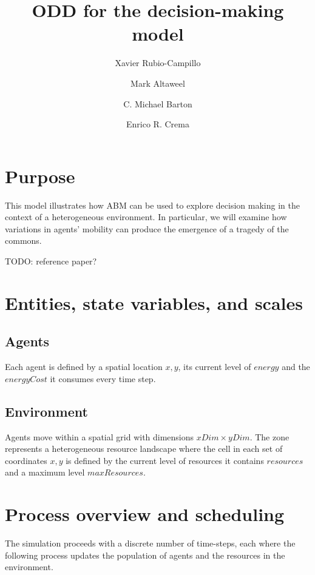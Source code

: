 \message{ !name(odd_decision_making.tex)}\documentclass[11pt,a4paper,twocolumn,notitlepage]{article}
\begin{document}


\title{ODD for the decision-making model}
\author{Xavier Rubio-Campillo \and Mark Altaweel \and C. Michael Barton \and Enrico R. Crema}
\maketitle

\section{Purpose}

This model illustrates how ABM can be used to explore decision making in the context of a heterogeneous environment. In particular, we will examine how variations in agents' mobility can produce the emergence of a tragedy of the commons.

TODO: reference paper?

\section{Entities, state variables, and scales}
\subsection{Agents}

Each agent is defined by a spatial location $x,y$, its current level of $energy$ and the $energyCost$ it consumes every time step.

\subsection{Environment}

Agents move within a spatial grid with dimensions $xDim \times yDim$. The zone represents a heterogeneous resource landscape where the cell in each set of coordinates $x,y$ is defined by the current level of resources it contains $resources$ and a maximum level $maxResources$. 

\section{Process overview and scheduling}

The simulation proceeds with a discrete number of time-steps, each where the following process updates the population of agents and the resources in the environment.
\end{document}
